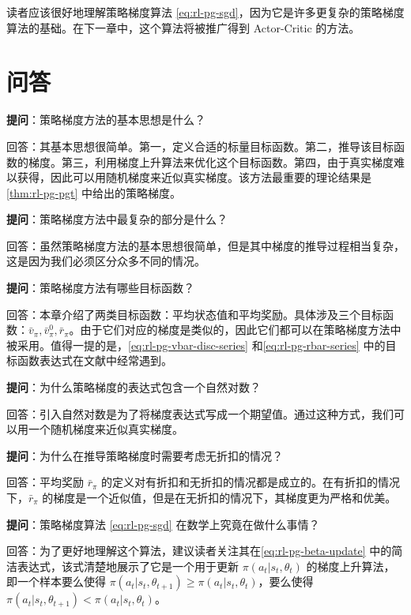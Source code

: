 读者应该很好地理解策略梯度算法 \eqref{eq:rl-pg-sgd}，因为它是许多更复杂的策略梯度算法的基础。在下一章中，这个算法将被推广得到 Actor-Critic 的方法。

\section{问答}
\label{sec:rl-pg-qa}

\textbf{提问}：策略梯度方法的基本思想是什么？

回答：其基本思想很简单。第一，定义合适的标量目标函数。第二，推导该目标函数的梯度。第三，利用梯度上升算法来优化这个目标函数。第四，由于真实梯度难以获得，因此可以用随机梯度来近似真实梯度。该方法最重要的理论结果是\cref{thm:rl-pg-pgt} 中给出的策略梯度。

\textbf{提问}：策略梯度方法中最复杂的部分是什么？

回答：虽然策略梯度方法的基本思想很简单，但是其中梯度的推导过程相当复杂，这是因为我们必须区分众多不同的情况。

\textbf{提问}：策略梯度方法有哪些目标函数？

回答：本章介绍了两类目标函数：平均状态值和平均奖励。具体涉及三个目标函数：$\bar{v}_{\pi}, \bar{v}_{\pi}^{0}, \bar{r}_{\pi}$。由于它们对应的梯度是类似的，因此它们都可以在策略梯度方法中被采用。值得一提的是，\cref{eq:rl-pg-vbar-disc-series} 和\cref{eq:rl-pg-rbar-series} 中的目标函数表达式在文献中经常遇到。

\textbf{提问}：为什么策略梯度的表达式包含一个自然对数？

回答：引入自然对数是为了将梯度表达式写成一个期望值。通过这种方式，我们可以用一个随机梯度来近似真实梯度。

\textbf{提问}：为什么在推导策略梯度时需要考虑无折扣的情况？

回答：平均奖励 $\bar{r}_{\pi}$ 的定义对有折扣和无折扣的情况都是成立的。在有折扣的情况下，$\bar{r}_{\pi}$ 的梯度是一个近似值，但是在无折扣的情况下，其梯度更为严格和优美。

\textbf{提问}：策略梯度算法 \eqref{eq:rl-pg-sgd} 在数学上究竟在做什么事情？

回答：为了更好地理解这个算法，建议读者关注其在\cref{eq:rl-pg-beta-update} 中的简洁表达式，该式清楚地展示了它是一个用于更新 $\pi(a_t|s_t,\theta_t)$ 的梯度上升算法，即一个样本要么使得 $\pi(a_t|s_t,\theta_{t+1})\geqslant \pi(a_t|s_t,\theta_t)$，要么使得 $\pi(a_t|s_t,\theta_{t+1}) < \pi(a_t|s_t,\theta_t)$。
